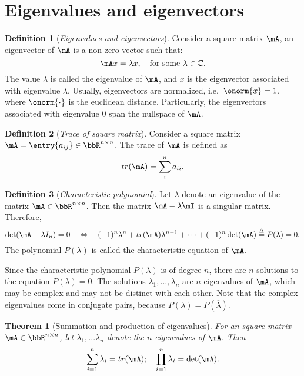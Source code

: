 \documentclass[11pt]{article}
\theoremstyle{plain}
\newtheorem{thm}{Theorem}[section]
\theoremstyle{definition}
\newtheorem{defn}{Definition}
\begin{document}
\section{Eigenvalues and eigenvectors}
\begin{defn}[\textit{Eigenvalues and eigenvectors}]\label{def:eigen}
	Consider a square matrix $\mA$, an eigenvector of $\mA$ is a non-zero vector such that:
	\[ \mA x = \lambda x, \quad \text{for some } \lambda \in \mathbb{C}. \]
	The value $\lambda$ is called the eigenvalue of $\mA$, and $x$ is the eigenvector associated with eigenvalue $\lambda$. Usually, eigenvectors are normalized, i.e.\ $\onorm{x} = 1$, where $\onorm{\cdot}$ is the euclidean distance. Particularly, the eigenvectors associated with eigenvalue 0 span the nullspace of $\mA$.
\end{defn}

\begin{defn}[\textit{Trace of square matrix}]\label{def:trace}
Consider a square matrix $\mA = \entry{a_{ij}} \in \bbR^{n \times n}$. The trace of $\mA$ is defined as
\[ tr(\mA) = \sum_{i}^n a_{ii}.\] 
\end{defn}

\begin{defn}[\textit{Characteristic polynomial}]\label{def:charac}
	Let $\lambda$ denote an eigenvalue of the matrix $\mA\in \bbR^{n \times n}$. Then the matrix $\mA - \lambda \mI$ is a singular matrix. Therefore,
	\[ \det(\mA - \lambda I_n) = 0 \quad  \Leftrightarrow \quad (-1)^n \lambda^n + tr(\mA)\lambda^{n-1} + \cdots + (-1)^n \det(\mA) \overset{\Delta}{=} P(\lambda) = 0.   \]
	 The polynomial $P(\lambda)$ is called the characteristic equation of $\mA$. 
\end{defn}

Since the characteristic polynomial $P(\lambda)$ is of degree $n$, there are $n$ solutions to the equation $P(\lambda) = 0$. The solutions $\lambda_1,...,\lambda_n$ are $n$ eigenvalues of $\mA$, which may be complex and may not be distinct with each other. Note that the complex eigenvalues come in conjugate pairs, because $\overline{ P(\lambda)} = P(\overline{ \lambda})$. 

\begin{thm}[Summation and production of eigenvalues]\label{thm:speigen}
	For an square matrix $\mA \in \bbR^{n \times n}$, let $\lambda_1,...\lambda_n$ denote the $n$ eigenvalues of $\mA$. Then 
	\begin{equation}
		\sum_{i=1}^n \lambda_i = tr(\mA); \quad \prod_{i=1}^n \lambda_i = \det(\mA).
	\end{equation} 
\end{thm}
\end{document}

